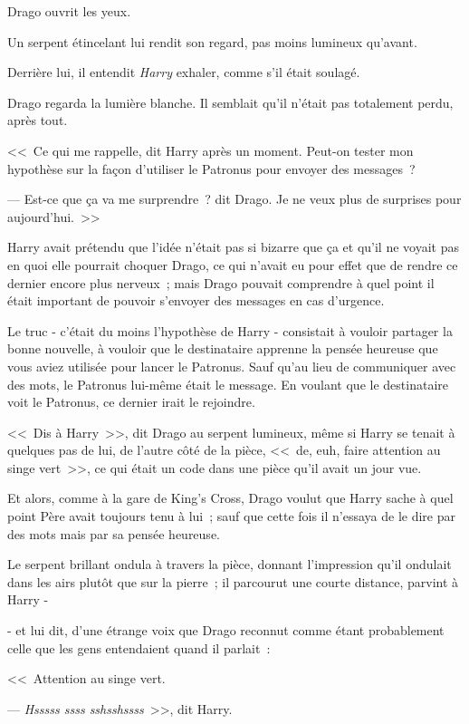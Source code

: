 Drago ouvrit les yeux.

Un serpent étincelant lui rendit son regard, pas moins lumineux qu'avant.

Derrière lui, il entendit \emph{Harry} exhaler, comme s'il était soulagé.

Drago regarda la lumière blanche. Il semblait qu'il n'était pas totalement perdu, après tout.

<<~Ce qui me rappelle, dit Harry après un moment. Peut-on tester mon hypothèse sur la façon d'utiliser le Patronus pour envoyer des messages~?

--- Est-ce que ça va me surprendre~? dit Drago. Je ne veux plus de surprises pour aujourd'hui.~>>

\later

Harry avait prétendu que l'idée n'était pas si bizarre que ça et qu'il ne voyait pas en quoi elle pourrait choquer Drago, ce qui n'avait eu pour effet que de rendre ce dernier encore plus nerveux~; mais Drago pouvait comprendre à quel point il était important de pouvoir s'envoyer des messages en cas d'urgence.

Le truc - c'était du moins l'hypothèse de Harry - consistait à vouloir partager la bonne nouvelle, à vouloir que le destinataire apprenne la pensée heureuse que vous aviez utilisée pour lancer le Patronus. Sauf qu'au lieu de communiquer avec des mots, le Patronus lui-même était le message. En voulant que le destinataire voit le Patronus, ce dernier irait le rejoindre.

<<~Dis à Harry~>>, dit Drago au serpent lumineux, même si Harry se tenait à quelques pas de lui, de l'autre côté de la pièce, <<~de, euh, faire attention au singe vert~>>, ce qui était un code dans une pièce qu'il avait un jour vue.

Et alors, comme à la gare de King's Cross, Drago voulut que Harry sache à quel point Père avait toujours tenu à lui~; sauf que cette fois il n'essaya de le dire par des mots mais par sa pensée heureuse.

Le serpent brillant ondula à travers la pièce, donnant l'impression qu'il ondulait dans les airs plutôt que sur la pierre~; il parcourut une courte distance, parvint à Harry -

- et lui dit, d'une étrange voix que Drago reconnut comme étant probablement celle que les gens entendaient quand il parlait~:

<<~Attention au singe vert.

--- \emph{Hsssss ssss sshsshssss}~>>, dit Harry.


